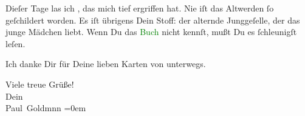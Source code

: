 \pstart
           Dieſer Tage las ich \label{K_L03213-3v}\label{K_L03213-3h}, das mich tief ergriffen hat. Nie iſt das Altwerden ſo geſchildert
               worden. {\pb}Es iſt übrigens Dein Stoff: der alternde
               Junggeſelle, der das junge Mädchen  liebt. Wenn
               Du das \textcolor{green}{Buch}{}\ledrightnote{{$\rightarrow$}\textcolor{green}{Fort comme la mort}} nicht kennſt, mußt
               Du es ſchleunigſt leſen.\pend
           
\pstart
           Ich danke Dir für Deine lieben Karten \strikeout{\textcolor{gray}{aus}} von unterwegs.\pend
           
\pstart
           Viele treue Grüße! {\\[\baselineskip]}Dein {\\[\baselineskip]}\spacefill\mbox{Paul Goldmnn}\pend
           \leftskip=0em{}\endnumbering{}
\begin{anhang}
\end{anhang}
      